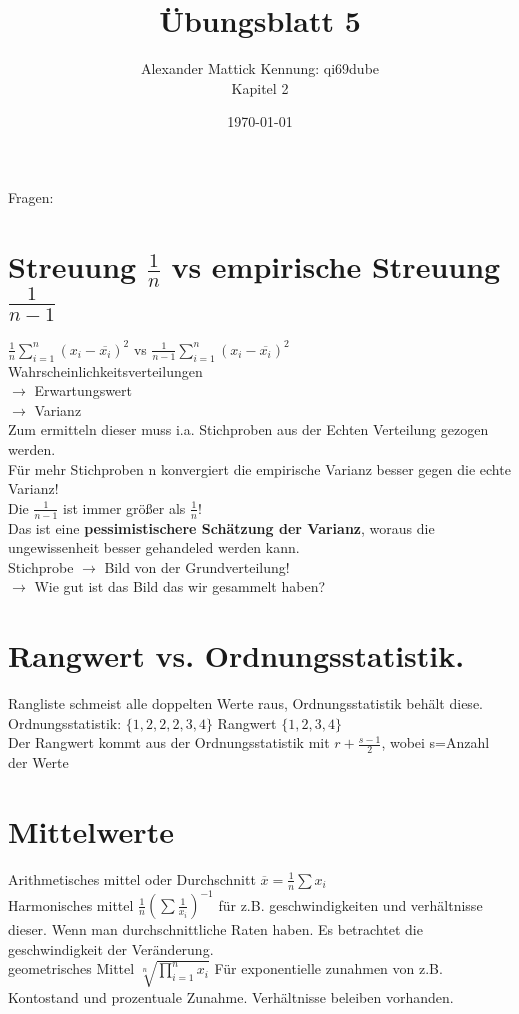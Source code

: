 \documentclass{article}
\title{Übungsblatt 5}
\author{
Alexander Mattick Kennung: qi69dube\\
Kapitel 2
}
\date{\today}
\begin{document}
	\maketitle
	Fragen:\\
	\section{Streuung $\frac{1}{n}$ vs empirische Streuung $\frac{1}{n-1}$}
	$\frac{1}{n}\sum\limits^n_{i=1}(x_i-\overline{x_i})^2$ vs $\frac{1}{n-1}\sum\limits^n_{i=1}(x_i-\overline{x_i})^2$\\
	Wahrscheinlichkeitsverteilungen\\
	$\to$ Erwartungswert\\
	$\to$ Varianz\\
	Zum ermitteln dieser muss i.a. Stichproben aus der Echten Verteilung gezogen werden.\\
	Für mehr Stichproben n konvergiert die empirische Varianz besser gegen die echte Varianz!\\
	Die $\frac{1}{n-1}$ ist immer größer als $\frac{1}{n}$!\\
	Das ist eine \textbf{pessimistischere Schätzung der Varianz}, woraus die ungewissenheit besser gehandeled werden kann.\\
	Stichprobe $\to$ Bild von der Grundverteilung!\\
	$\to$ Wie gut ist das Bild das wir gesammelt haben?
	\section{Rangwert vs. Ordnungsstatistik.}
	Rangliste schmeist alle doppelten Werte raus, Ordnungsstatistik behält diese.\\
	Ordnungsstatistik: $\{1,2,2,2,3,4\}$ Rangwert $\{1,2,3,4\}$\\
	Der Rangwert kommt aus der Ordnungsstatistik mit $r+\frac{s-1}{2}$, wobei s=Anzahl der Werte
	\section{Mittelwerte}
	Arithmetisches mittel oder Durchschnitt $\overline{x}=\frac{1}{n}\sum x_i$\\
	Harmonisches mittel $\frac{1}{n}(\sum \frac{1}{x_i})^{-1}$ für z.B. geschwindigkeiten und verhältnisse dieser. Wenn man durchschnittliche Raten haben. Es betrachtet die geschwindigkeit der Veränderung.\\
	geometrisches Mittel $\sqrt[n]{\prod\limits^n_{i=1} x_i}$ Für exponentielle zunahmen von z.B. Kontostand und prozentuale Zunahme. Verhältnisse beleiben vorhanden.
\end{document}
